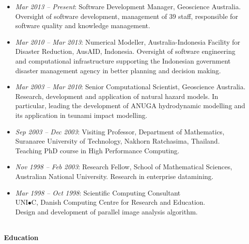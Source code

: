 \documentclass[11pt,a4paper]{article}
\begin{document}
\begin{itemize}
\item {\em Mar 2013 -- Present}: Software Development Manager, Geoscience Australia.
      Oversight of software development, management of 39 staff, responsible for software quality and knowledge management.
\item {\em Mar 2010 -- Mar 2013}: Numerical Modeller, Australia-Indonesia Facility for Disaster Reduction, AusAID, Indonesia.
      Oversight of software engineering and computational infrastructure supporting the Indonesian government disaster management agency in better planning and decision making.
\item {\em Mar 2003 -- Mar 2010}: Senior Computational Scientist, Geoscience Australia.
      Research, development and application of natural hazard models. In particular, leading the development of ANUGA hydrodynamic modelling and its application in tsunami impact modelling.
\item {\em Sep 2003 -- Dec 2003}: Visiting Professor,
      Department of Mathematics,
      Suranaree University of Technology, Nakhorn Ratchasima, Thailand. Teaching PhD course in
      High Performance Computing.
\item {\em Nov 1998 -- Feb 2003}: Research Fellow,
      School of Mathematical Sciences, Australian National University.
      Research in enterprise datamining.
\item {\em Mar 1998 -- Oct 1998}: Scientific Computing Consultant \\
      UNI$\bullet$C, Danish Computing Centre for Research and Education.\\
      Design and development of parallel image analysis algorithm.
\end{itemize}

\pagebreak
\begin{center}
  \hrulefill \\
  {\bf Education} \\[-0.2cm]
  \hrulefill
\end{center}
\end{document}
